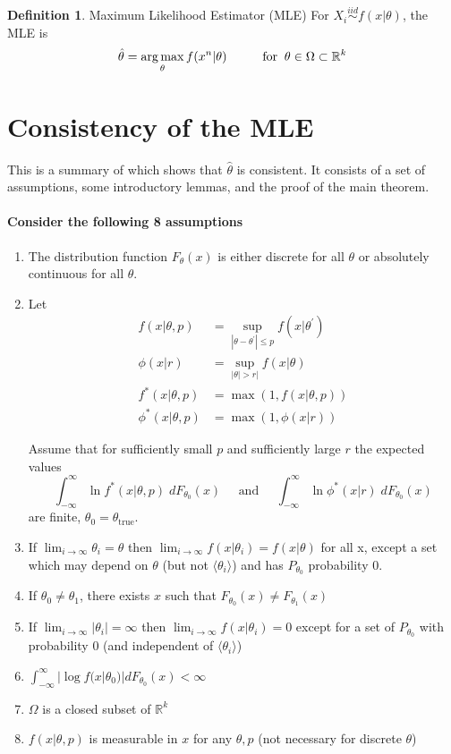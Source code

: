 \documentclass[letterpaper,11pt]{article}
\newcommand{\R}{\mathbb{R}}
\DeclareMathOperator*{\argmax}{arg\,max}
\newcounter{thm}
\theoremstyle{definition}
\newtheorem{defn}[thm]{Definition}
\begin{document}
\begin{defn}{Maximum Likelihood Estimator (MLE)}
For $X_i \overset{iid}{\sim} f(x|\theta)$, the MLE is $$\hat\theta = \argmax_\theta f(x^n|\theta) \text{\hspace{1cm}for}\;\; \theta\in\Omega\subset \R^k$$ 
\end{defn}

\section{Consistency of the MLE}
This is a summary of \citet{waldNoteConsistencyMaximum1949} which shows that $\hat\theta$ is consistent. It consists of a set of assumptions, some introductory lemmas, and the proof of the main theorem.

\paragraph{Consider the following 8 assumptions}
\begin{enumerate}
\item The distribution function $F_\theta(x)$ is either discrete for all $\theta$ or absolutely continuous for all $\theta$.
\item Let \vspace{-1em}
\begin{align*}
\displaystyle f(x|\theta, p) &= \sup_{|\theta-\theta^\prime|\leq p} f(x|\theta^\prime)\\
\displaystyle \phi(x|r) &= \sup_{|\theta| > r|} f(x|\theta)\\
\displaystyle f^\ast(x|\theta,p) &= \max(1, f(x|\theta,p))\\
\displaystyle \phi^\ast(x|\theta,p) &= \max(1, \phi(x|r))
\end{align*}

Assume that for sufficiently small $p$ and sufficiently large $r$ the expected values 
$$\int_{-\infty}^\infty \ln f^\ast(x|\theta,p) \;dF_{\theta_0}(x) \;\;\;\;\;\text{and}\;\;\;\;\; 
  \int_{-\infty}^\infty \ln \phi^\ast(x|r) \;dF_{\theta_0}(x)$$ 
are finite, $\theta_0 = \theta_{\text{true}}$. 

\item If $\displaystyle \lim_{i\rightarrow\infty}\theta_i = \theta$ then $\displaystyle \lim_{i\rightarrow\infty} f(x|\theta_i) = f(x|\theta)$ for all x, except a set which may depend on $\theta$ (but not $\langle\theta_i\rangle$) and has $P_{\theta_0}$ probability 0.
\item If $\theta_0 \neq \theta_1$, there exists $x$ such that $F_{\theta_0}(x) \neq F_{\theta_1}(x)$
\item If $\displaystyle \lim_{i\rightarrow\infty}|\theta_i| = \infty$ then $\displaystyle \lim_{i\rightarrow\infty} f(x|\theta_i) = 0$ except for a set of $P_{\theta_0}$ with probability 0 (and independent of $\langle\theta_i\rangle$)
\item $\int_{-\infty}^\infty |\log f(x|\theta_0)| dF_{\theta_0}(x) < \infty$
\item $\Omega$ is a closed subset of $\R^k$
\item $f(x|\theta,p)$ is measurable in $x$ for any $\theta, p$ (not necessary for discrete $\theta$)
\end{enumerate}
\end{document}
